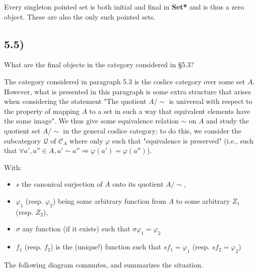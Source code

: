 \documentclass[12pt, letterpaper, twoside]{report}
\begin{document}
Every singleton pointed set is both initial and final in \textbf{Set*} and is thus a zero object. These are also the only such pointed sets.



\subsection*{5.5)}

What are the final objects in the category considered in §5.3?

The category considered in paragraph 5.3 is the coslice category over some set $A$. However, what is presented in this paragraph is some extra structure that arises when considering the statement "The quotient $A/\sim$ is universal with respect to the property of mapping $A$ to a set in such a way that equivalent elements have the same image". We thus give some equivalence relation $\sim$ on $A$ and study the quotient set $A/\sim$ in the general coslice category; to do this, we consider the subcategory $\mathcal{Q}$ of $\mathcal{C}_A$ where only $\varphi$ such that "equivalence is preserved" (i.e., such that $\forall a', a'' \in A, a' \sim a'' \Rightarrow \varphi(a') = \varphi(a'')$).

With:
\begin{itemize}
	\item $s$ the canonical surjection of $A$ onto its quotient $A/\sim$,
	\item $\varphi_1$ (resp. $\varphi_2$) being some arbitrary function from $A$ to some arbitrary $Z_1$ (resp. $Z_2$),
	\item $\sigma$ any function (if it exists) such that $\sigma \varphi_1 = \varphi_2$
	\item $f_1$ (resp. $f_2$) is the (unique!) function such that $s f_1 = \varphi_1$ (resp. $s f_2 = \varphi_2$)
\end{itemize}

The following diagram commutes, and summarizes the situation.

\end{document}
